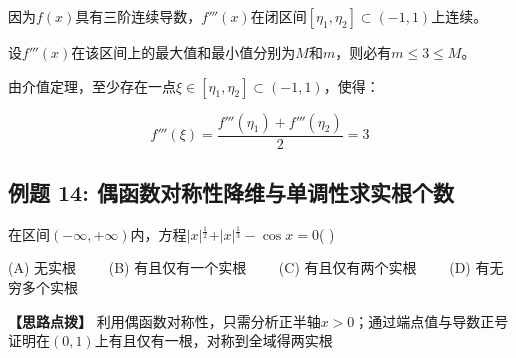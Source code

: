 \documentclass[11pt,a4paper,UTF8]{ctexart}
\begin{document}
\begin{solbox}[分步推导与答题规范]
因为$f(x)$具有三阶连续导数，$f'''(x)$在闭区间$[\eta_1, \eta_2] \subset (-1, 1)$上连续。

设$f'''(x)$在该区间上的最大值和最小值分别为$M$和$m$，则必有$m \le 3 \le M$。

由介值定理，至少存在一点$\xi \in [\eta_1, \eta_2] \subset (-1, 1)$，使得：


\begin{equation*}
f'''(\xi) = \frac{f'''(\eta_1) + f'''(\eta_2)}{2} = 3
\end{equation*}

\end{solbox}


\subsection{例题 14: 偶函数对称性降维与单调性求实根个数}

在区间$(-\infty, +\infty)$内，方程$\vert{}x\vert{}^{\frac{1}{2}} + \vert{}x\vert{}^{\frac{1}{3}} - \cos x = 0$( )

(A) 无实根 $\qquad$(B) 有且仅有一个实根 $\qquad$(C) 有且仅有两个实根 $\qquad$(D) 有无穷多个实根

\textbf{\color{DeepPurple}【思路点拨】} 利用偶函数对称性，只需分析正半轴$x > 0$；通过端点值与导数正号证明在$(0, 1)$上有且仅有一根，对称到全域得两实根
\end{document}
